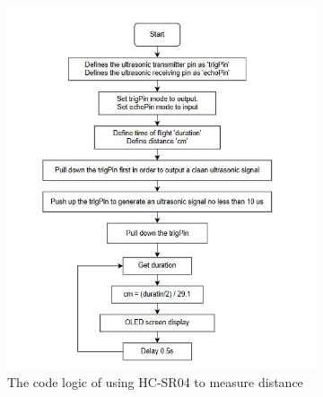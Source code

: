 \begin{figure}[H] %
    \centering %
    \captionsetup{labelsep=colon}
    \begin{subfigure}{0.45\textwidth} %
        \centering
        \includegraphics[width=\linewidth]{Image/Design/code_logic_tof.jpg}
        \caption{\centering The code logic of using HC-SR04 to measure distance}
        \label{fig:cl_tof}
    \end{subfigure}
    \begin{subfigure}{0.45\textwidth} %
        \centering

\end{subfigure}
\end{figure}
